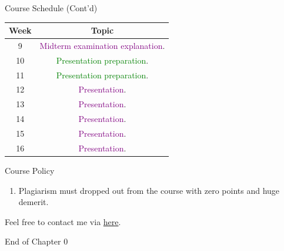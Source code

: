 \documentclass{beamer}
\begin{document}
\begin{frame}{Course Schedule (Cont'd)}
\begin{center}
\begin{tabular}{|c|c|}
\hline
Week & Topic \\
\hline
9 & \textcolor{purple}{Midterm examination explanation}.\\
\hline
10 & \textcolor{Green}{Presentation preparation}.\\
\hline
11 & \textcolor{Green}{Presentation preparation}.\\
\hline
12 & \textcolor{purple}{Presentation}.\\
\hline
13 & \textcolor{purple}{Presentation}.\\
\hline
14 & \textcolor{purple}{Presentation}.\\
\hline
15 & \textcolor{purple}{Presentation}.\\
\hline
16 & \textcolor{purple}{Presentation}.\\
\hline
\end{tabular}
\end{center}
\end{frame}
\begin{frame}{Course Policy}
\begin{enumerate}
\item Plagiarism must dropped out from the course with zero points and huge demerit. \\
\end{enumerate}
\end{frame}
\begin{frame}{}
\begin{center}
\Large{Feel free to contact me via \href{mailto:politics.tchsiao@gmail.com}{here}.}
\end{center}
\end{frame}
\begin{frame}{}
\begin{center}
\Large{End of Chapter 0}
\end{center}
\end{frame}
\end{document}
